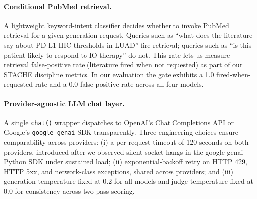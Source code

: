\documentclass[11pt]{article}
\begin{document}
\paragraph{Conditional PubMed retrieval.}
A lightweight keyword-intent classifier decides whether to invoke PubMed retrieval for a given generation request. Queries such as ``what does the literature say about PD-L1 IHC thresholds in LUAD'' fire retrieval; queries such as ``is this patient likely to respond to IO therapy'' do not. This gate lets us measure retrieval false-positive rate (literature fired when not requested) as part of our STACHE discipline metrics. In our evaluation the gate exhibits a 1.0 fired-when-requested rate and a 0.0 false-positive rate across all four models.

\paragraph{Provider-agnostic LLM chat layer.}
A single \texttt{chat()} wrapper dispatches to OpenAI's Chat Completions API or Google's \texttt{google-genai} SDK transparently. Three engineering choices ensure comparability across providers: (i) a per-request timeout of 120 seconds on both providers, introduced after we observed silent socket hangs in the google-genai Python SDK under sustained load; (ii) exponential-backoff retry on HTTP 429, HTTP 5xx, and network-class exceptions, shared across providers; and (iii) generation temperature fixed at 0.2 for all models and judge temperature fixed at 0.0 for consistency across two-pass scoring.
\end{document}

